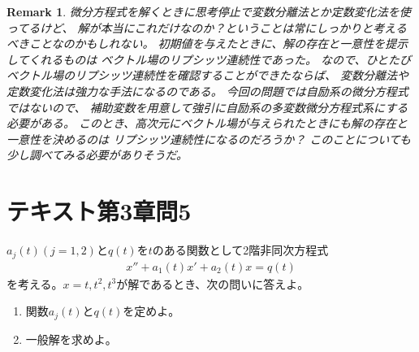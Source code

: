\documentclass{jsarticle}
\newtheorem{remark}{Remark}
\begin{document}
\begin{remark}
微分方程式を解くときに思考停止で変数分離法とか定数変化法を使ってるけど、
解が本当にこれだけなのか？ということは常にしっかりと考えるべきことなのかもしれない。
初期値を与えたときに、解の存在と一意性を提示してくれるものは
ベクトル場のリプシッツ連続性であった。
なので、ひとたびベクトル場のリプシッツ連続性を確認することができたならば、
変数分離法や定数変化法は強力な手法になるのである。
今回の問題では自励系の微分方程式ではないので、
補助変数を用意して強引に自励系の多変数微分方程式系にする必要がある。
このとき、高次元にベクトル場が与えられたときにも解の存在と一意性を決めるのは
リプシッツ連続性になるのだろうか？
このことについても少し調べてみる必要がありそうだ。
\end{remark}

\section{テキスト第3章問5}
\begin{screen}
$a_{j}(t)(j=1,2)$と$q(t)$を$t$のある関数として2階非同次方程式
\begin{eqnarray}
x''+a_{1}(t)x'+a_{2}(t)x=q(t)
\end{eqnarray}
を考える。$x=t,t^{2},t^{3}$が解であるとき、次の問いに答えよ。
\begin{enumerate}
\item 関数$a_{j}(t)$と$q(t)$を定めよ。
\item 一般解を求めよ。
\end{enumerate}
\end{screen}
\end{document}

